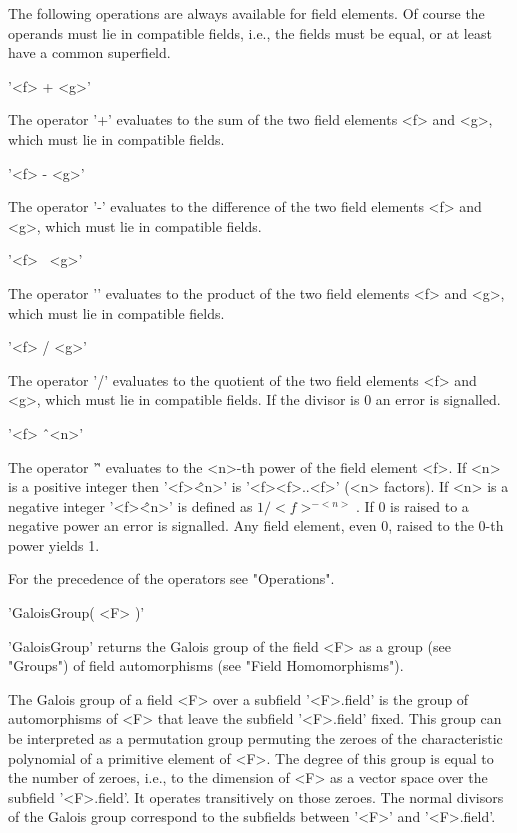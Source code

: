 
The following operations  are always available for   field elements.   Of
course the operands must lie in compatible fields,  i.e., the fields must
be equal, or at least have a common superfield.

'<f> + <g>'

The operator '+' evaluates to  the sum of  the two field elements <f> and
<g>, which must lie in compatible fields.

'<f> - <g>'

The operator  '-'  evaluates to the difference of  the two field elements
<f> and <g>, which must lie in compatible fields.

'<f> \*\ <g>'

The operator '\*' evaluates to the product  of the two field elements <f>
and <g>, which must lie in compatible fields.

'<f> / <g>'

The operator '/' evaluates to the quotient of the two field  elements <f>
and <g>, which must  lie  in compatible fields.  If the  divisor is  0 an
error is signalled.

'<f> \^\ <n>'

The operator '\^' evaluates to the <n>-th power of the field element <f>.
If <n> is a  positive  integer  then  '<f>\^<n>'  is  '<f>\*<f>\*..\*<f>'
(<n> factors).  If <n> is a negative integer  '<f>\^<n>'  is  defined  as
$1 / {<f>^{-<n>}}$.   If 0 is  raised  to  a negative power   an error is
signalled.  Any field element, even 0, raised to the 0-th power yields 1.

For the precedence of the operators see "Operations".


'GaloisGroup( <F> )'

'GaloisGroup' returns the Galois group of  the field <F>  as a group (see
"Groups") of field automorphisms (see "Field Homomorphisms").

The Galois group of a field <F> over a subfield '<F>.field' is the  group
of automorphisms of <F> that  leave the subfield '<F>.field' fixed.  This
group can be interpreted as a permutation group  permuting  the zeroes of
the characteristic polynomial of a primitive  element of <F>.  The degree
of this group is equal to the number of zeroes, i.e., to the dimension of
<F>  as  a vector  space  over  the subfield  '<F>.field'.   It  operates
transitively on those  zeroes.   The normal divisors of the  Galois group
correspond to the subfields between '<F>' and '<F>.field'.


